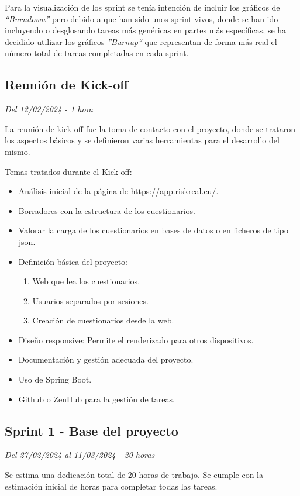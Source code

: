 Para la visualización de los sprint se tenía intención de incluir los gráficos de \textit{``Burndown''} pero debido a que han sido unos sprint vivos, donde se han ido incluyendo o desglosando tareas más genéricas en partes más específicas, se ha decidido utilizar los gráficos \textit{''Burnup``} que representan de forma más real el número total de tareas completadas en cada sprint.

\subsection{Reunión de Kick-off}
\textit{Del 12/02/2024 - 1 hora}

La reunión de kick-off fue la toma de contacto con el proyecto, donde se trataron los aspectos básicos y se definieron varias herramientas para el desarrollo del mismo.

Temas tratados durante el Kick-off:
\begin{itemize}
	\item
	Análisis inicial de la página de \url{https://app.riskreal.eu/}.
	\item
	Borradores con la estructura de los cuestionarios.
	\item
	Valorar la carga de los cuestionarios en bases de datos o en ficheros de tipo json.
	\item
	Definición básica del proyecto:
	\begin{enumerate}
		\item
		Web que lea los cuestionarios.
		\item
		Usuarios separados por sesiones.
		\item
		Creación de cuestionarios desde la web.
	\end{enumerate}
	\item
	Diseño responsive: Permite el renderizado para otros dispositivos.
	\item
	Documentación y gestión adecuada del proyecto.
	\item
	Uso de Spring Boot.
	\item
	Github o ZenHub para la gestión de tareas.
\end{itemize}


\subsection{Sprint 1 - Base del proyecto}
\textit{Del 27/02/2024 al 11/03/2024 - 20 horas}

Se estima una dedicación total de 20 horas de trabajo.
Se cumple con la estimación inicial de horas para completar todas las tareas.

